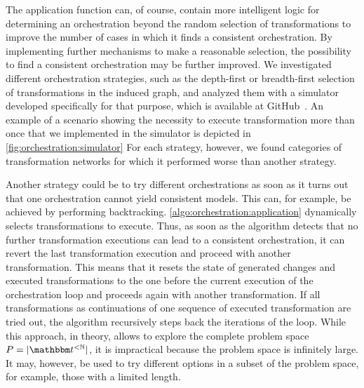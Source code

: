 The application function can, of course, contain more intelligent logic for determining an orchestration beyond the random selection of transformations to improve the number of cases in which it finds a consistent orchestration.
By implementing further mechanisms to make a reasonable selection, the possibility to find a consistent orchestration may be further improved.
We investigated different orchestration strategies, such as the depth-first or breadth-first selection of transformations in the induced graph, and analyzed them with a simulator developed specifically for that purpose, which is available at GitHub~\cite{orchestrationSimulator}.
An example of a scenario showing the necessity to execute transformation more than once that we implemented in the simulator is depicted in \autoref{fig:orchestration:simulator}
For each strategy, however, we found categories of transformation networks for which it performed worse than another strategy.

Another strategy could be to try different orchestrations as soon as it turns out that one orchestration cannot yield consistent models.
This can, for example, be achieved by performing backtracking.
\autoref{algo:orchestration:application} dynamically selects transformations to execute. 
Thus, as soon as the algorithm detects that no further transformation executions can lead to a consistent orchestration, it can revert the last transformation execution and proceed with another transformation.
This means that it resets the state of generated changes and executed transformations to the one before the current execution of the orchestration loop and proceeds again with another transformation.
If all transformations as continuations of one sequence of executed transformation are tried out, the algorithm recursively steps back the iterations of the loop.
While this approach, in theory, allows to explore the complete problem space $P = \abs{\transformationset{T}^{< \mathbb{N}}}$, it is impractical because the problem space is infinitely large.
It may, however, be used to try different options in a subset of the problem space, for example, those with a limited length.


